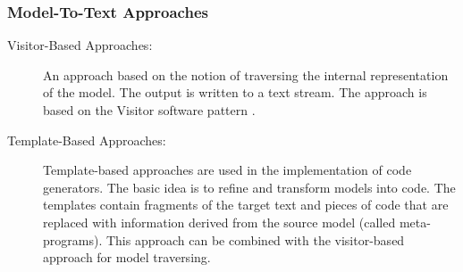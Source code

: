 \subsubsection{Model-To-Text Approaches}
\begin{description}

\item[Visitor-Based Approaches:]
An approach based on the notion of traversing the internal representation of the model. The output is written to a text stream. The approach is based on the Visitor software pattern \cite{gamma1994design}. 

\item[Template-Based Approaches:]
Template-based approaches are used in the implementation of code generators. The basic idea is to refine and transform models into code. The templates contain fragments of the target text and pieces of code that are replaced with information derived from the source model (called meta-programs). This approach can be combined with the visitor-based approach for model traversing. 
\end{description}

